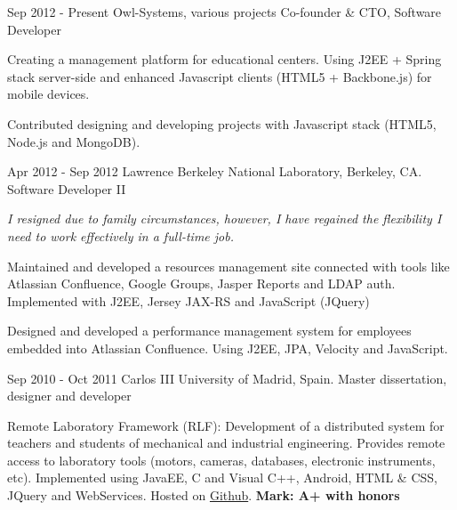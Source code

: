 
\experience
  {Sep 2012 - Present}
  {Owl-Systems, various projects}
  {Co-founder \& CTO, Software Developer}
  {\vspace{-1em}\begin{rlist}
    \item Creating a management platform for educational centers. Using J2EE +
    Spring stack server-side and enhanced Javascript clients (HTML5 +
    Backbone.js) for mobile devices.
    \item Contributed designing and developing projects with Javascript stack
    (HTML5, Node.js and MongoDB).
  \end{rlist}}

\experience
  {Apr 2012 - Sep 2012}
  {Lawrence Berkeley National Laboratory, Berkeley, CA.}
  {Software Developer II}
  {\emph{I resigned due to family circumstances, however, I have
    regained the flexibility I need to work effectively in a full-time
    job.}
    \begin{rlist}
    \item Maintained and developed a resources management site
    connected with tools like Atlassian Confluence, Google Groups, Jasper
    Reports and LDAP auth. Implemented with J2EE, Jersey JAX-RS and
    JavaScript (JQuery)
    \item Designed and developed a performance management system for
    employees embedded into Atlassian Confluence. Using J2EE, JPA,
    Velocity and JavaScript.
  \end{rlist}}

\experience
  {Sep 2010 - Oct 2011}
  {Carlos III University of Madrid, Spain.}
  {Master dissertation, designer and developer}
  {\vspace{-1em}\begin{rlist}
    \item Remote Laboratory Framework (RLF): Development of a distributed
    system for teachers and students of mechanical and industrial
    engineering. Provides remote access to laboratory tools (motors,
    cameras, databases, electronic instruments, etc).
    Implemented using JavaEE, C and Visual C++,
    Android, HTML \& CSS, JQuery and WebServices. Hosted on \href{https://github.com/CarlosMecha/remote-laboratory-framework}{Github}.
    \textbf{Mark: A+ with honors}
  \end{rlist}}

